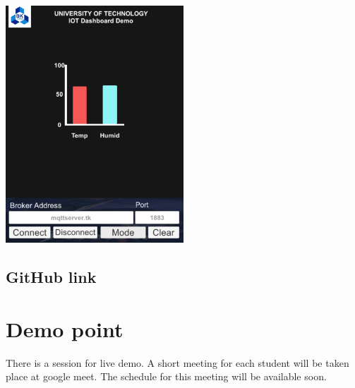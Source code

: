 \documentclass[a4paper,11pt]{article}
\theoremstyle{mytheor}
\begin{document}
\begin{center}
    \includegraphics[width=0.5\textwidth]{Scene3.png}\\
\end{center}

\subsection{GitHub link}

\begin{center}
 
\end{center}
\section{Demo point}
There is a session for live demo. A short meeting for each student will be taken place at google
meet. The schedule for this meeting will be available soon.
\end{document}

